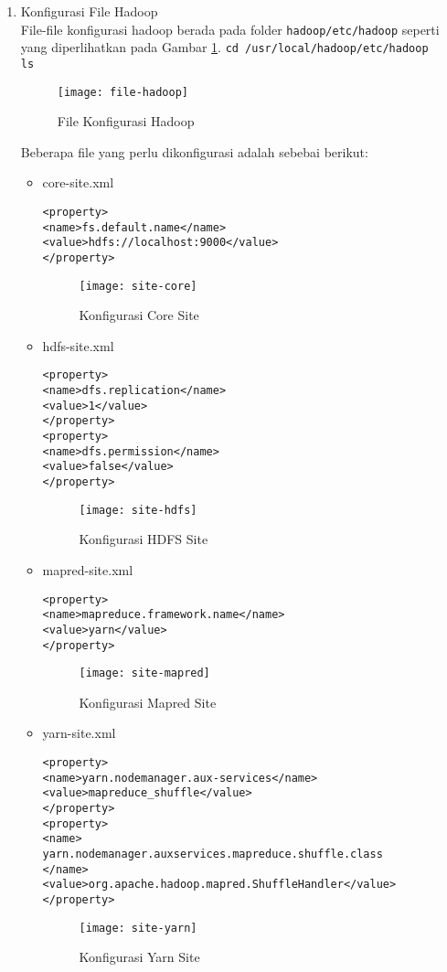 \documentclass[a4paper]{tufte-handout}
\begin{document}
\begin{enumerate}
\item Konfigurasi File Hadoop \\
File-file konfigurasi hadoop berada pada folder {\tt hadoop/etc/hadoop} seperti yang diperlihatkan pada Gambar \ref{gam:file-hadoop}.
{\tt cd /usr/local/hadoop/etc/hadoop} \\
{\tt ls}
\begin{figure}[!ht]
\texttt{[image: file-hadoop]}
\caption{File Konfigurasi Hadoop}
\label{gam:file-hadoop}
\end{figure}

Beberapa file yang perlu dikonfigurasi adalah sebebai berikut:
\begin{itemize}

\item core-site.xml
\begin{lstlisting}
<property>
<name>fs.default.name</name>
<value>hdfs://localhost:9000</value>
</property>
\end{lstlisting}
\begin{figure}[!ht]
\centering
\texttt{[image: site-core]}
\caption{Konfigurasi Core Site}
\label{gam:site-yarn}
\end{figure}

\item hdfs-site.xml
\begin{lstlisting}
<property>
<name>dfs.replication</name>
<value>1</value>
</property>
<property>
<name>dfs.permission</name>
<value>false</value>
</property>
\end{lstlisting}
\begin{figure}[!ht]
\centering
\texttt{[image: site-hdfs]}
\caption{Konfigurasi HDFS Site}
\label{gam:site-yarn}
\end{figure}

\item mapred-site.xml
\begin{lstlisting}
<property>
<name>mapreduce.framework.name</name>
<value>yarn</value>
</property>
\end{lstlisting}
\begin{figure}[!ht]
\texttt{[image: site-mapred]}
\caption{Konfigurasi Mapred Site}
\label{gam:site-yarn}
\end{figure}

\item yarn-site.xml
\begin{lstlisting}
<property>
<name>yarn.nodemanager.aux-services</name>
<value>mapreduce_shuffle</value>
</property>
<property>
<name>
yarn.nodemanager.auxservices.mapreduce.shuffle.class
</name>
<value>org.apache.hadoop.mapred.ShuffleHandler</value>
</property>
\end{lstlisting}
\begin{figure}[!ht]
\texttt{[image: site-yarn]}
\caption{Konfigurasi Yarn Site}
\label{gam:site-yarn}
\end{figure}
\end{itemize}


\end{enumerate}
\end{document}

